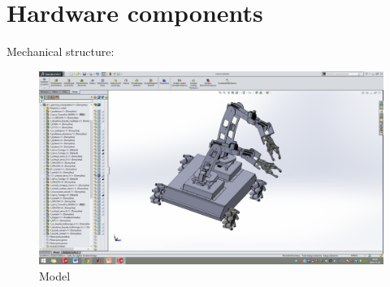\section{Hardware components}
\label{sec:hard}

Mechanical structure:

\begin{figure}[H]
\centering
\includegraphics[trim=21cm 5cm 18cm 5cm, clip=true, totalheight=0.5\textheight]{fig/model}
\caption{Model}
\end{figure}

